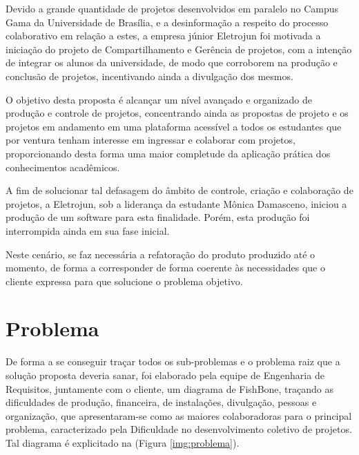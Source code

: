 Devido a grande quantidade de projetos desenvolvidos em paralelo no Campus Gama da Universidade de Brasília, e a desinformação a respeito do processo colaborativo em relação a estes, a empresa júnior Eletrojun foi motivada a iniciação do projeto de Compartilhamento e Gerência de projetos, com a intenção de integrar os alunos da universidade, de modo que corroborem na produção e conclusão de projetos, incentivando ainda a divulgação dos mesmos.

O objetivo desta proposta é alcançar um nível avançado e organizado de produção e controle de projetos, concentrando ainda as propostas de projeto e os projetos em andamento em uma plataforma acessível a todos os estudantes que por ventura tenham interesse em ingressar e colaborar com projetos, proporcionando desta forma uma maior completude da aplicação prática dos conhecimentos acadêmicos.

A fim de solucionar tal defasagem do âmbito de controle, criação e colaboração de projetos, a Eletrojun, sob a liderança da estudante Mônica Damasceno, iniciou a produção de um software para esta finalidade. Porém, esta produção foi interrompida ainda em sua fase inicial.

Neste cenário, se faz necessária a refatoração do produto produzido até o momento, de forma a corresponder de forma coerente às necessidades que o cliente expressa para que solucione o problema objetivo.

\section {Problema}

De forma a se conseguir traçar todos os sub-problemas e o problema raiz que a solução proposta deveria sanar, foi elaborado pela equipe de Engenharia de Requisitos, juntamente com o cliente, um diagrama de FishBone, traçando as dificuldades de produção, financeira, de instalações, divulgação, pessoas e organização, que apresentaram-se como as maiores colaboradoras para o principal problema, caracterizado pela Dificuldade no desenvolvimento coletivo de projetos. Tal diagrama é explicitado na (Figura \ref{img:problema}).


